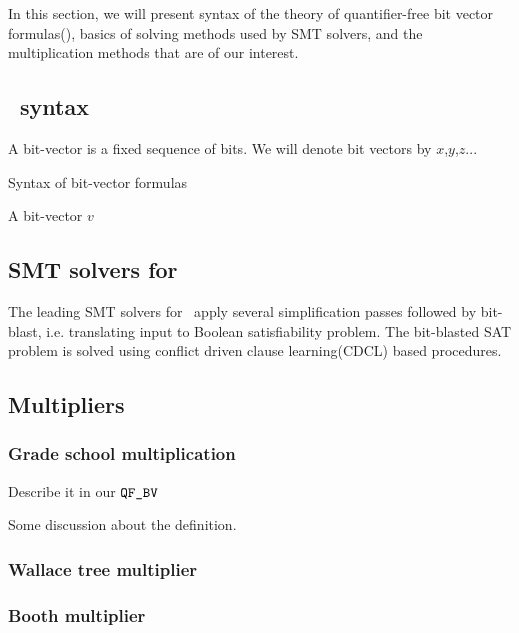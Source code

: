 In this section, we will present syntax of
the theory of quantifier-free bit vector formulas(\qfbv),
basics of solving methods used by SMT solvers,
and the multiplication methods that are of our interest. 

\subsection{\qfbv~syntax}

A bit-vector is a fixed sequence of bits.
%
We will denote bit vectors by $x$,$y$,$z$...

Syntax of bit-vector formulas

A bit-vector $v$

\subsection{SMT solvers for \qfbv}

The leading SMT solvers for \qfbv~apply several simplification
passes followed by bit-blast, i.e. translating input to Boolean
satisfiability problem.
%
The bit-blasted SAT problem is solved using conflict driven clause
learning(CDCL) based procedures.
%




\subsection{Multipliers}



\subsubsection{Grade school multiplication}

Describe it in our $\texttt{QF\_BV}$



\begin{df}
  
\end{df}

Some discussion about the definition.

\begin{example}
  
\end{example}


\subsubsection{Wallace tree multiplier}

\subsubsection{Booth multiplier}






